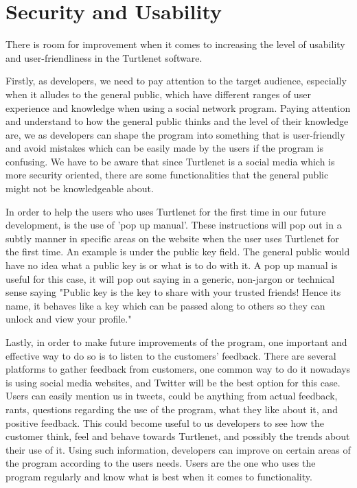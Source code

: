 \section{Security and Usability}
There is room for improvement when it comes to increasing the level of usability 
and user-friendliness in the Turtlenet software. 

Firstly, as developers, we need to pay attention to the target audience, especially 
when it alludes to the general public, which have different ranges of user experience 
and knowledge when using a social network program. Paying attention and understand 
to how the general public thinks and the level of their knowledge are, we as developers 
can shape the program into something that is user-friendly and avoid mistakes which 
can be easily made by the users if the program is confusing. We have to be aware that 
since Turtlenet is a social media which is more security oriented, there are some 
functionalities that the general public might not be knowledgeable about.

In order to help the users who uses Turtlenet for the first time in our future 
development, is the use of 'pop up manual'. These instructions will pop out in a 
subtly manner in specific areas on the website when the user uses Turtlenet for 
the first time. An example is under the public key field. The general public would 
have no idea what a public key is or what is to do with it. A pop up manual is useful 
for this case, it will pop out saying in a generic, non-jargon or technical sense 
saying "Public key is the key to share with your trusted friends! Hence its name, it 
behaves like a key which can be passed along to others so they can unlock and view 
your profile."

Lastly, in order to make future improvements of the program, one important and effective 
way to do so is to listen to the customers' feedback. There are several platforms to 
gather feedback from customers, one common way to do it nowadays is using social media 
websites, and Twitter will be the best option for this case. Users can easily mention us 
in tweets, could be anything from actual feedback, rants, questions regarding the use of 
the program, what they like about it, and positive feedback. This could become useful to 
us developers to see how the customer think, feel and behave towards Turtlenet, and 
possibly the trends about their use of it. Using such information, developers can improve 
on certain areas of the program according to the users needs. Users are the one who uses 
the program regularly and know what is best when it comes to functionality. 